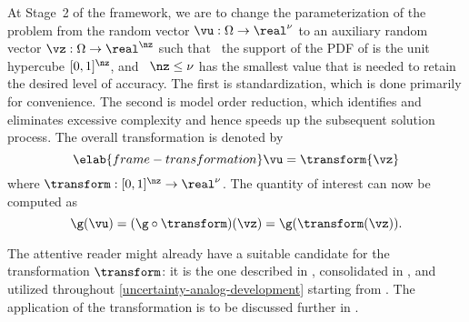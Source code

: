 At Stage~2 of the framework, we are to change the parameterization of the
problem from the random vector $\vu: \Omega \to \real^\nu$ to an auxiliary
random vector $\vz: \Omega \to \real^\nz$ such that \one~the support of the
\ac{PDF} of \vz is the unit hypercube $[0, 1]^\nz$, and \two~$\nz \leq \nu$ has
the smallest value that is needed to retain the desired level of accuracy. The
first is standardization, which is done primarily for convenience. The second is
model order reduction, which identifies and eliminates excessive complexity and
hence speeds up the subsequent solution process. The overall transformation is
denoted by
\begin{equation} \elab{frame-transformation}
  \vu = \transform{\vz}
\end{equation}
where $\transform: [0, 1]^\nz \to \real^\nu$. The quantity of interest \g can
now be computed as
\[
  \g(\vu) = (\g \circ \transform)(\vz) = \g(\transform(\vz)).
\]

The attentive reader might already have a suitable candidate for the
transformation $\transform$: it is the one described in
, consolidated in
, and utilized throughout
\cref{uncertainty-analog-development} starting from .
The application of the transformation is to be discussed further in
.
